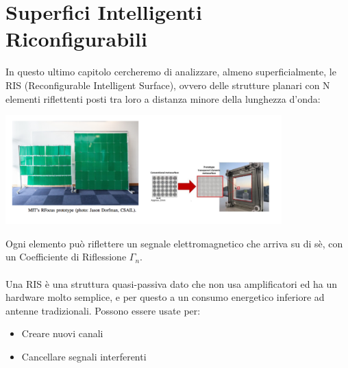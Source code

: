 \chapter{Superfici Intelligenti Riconfigurabili}
In questo ultimo capitolo cercheremo di analizzare, almeno superficialmente, le RIS (Reconfigurable Intelligent Surface), ovvero delle strutture planari con N elementi riflettenti posti tra loro a distanza minore della lunghezza d'onda:
\begin{center}
    \includegraphics[width=0.8\textwidth]{Images/RIS.png}
\end{center}
Ogni elemento può riflettere un segnale elettromagnetico che arriva su di sè, con un Coefficiente di Riflessione $\Gamma_n$.\\ \\
Una RIS è una struttura quasi-passiva dato che non usa amplificatori ed ha un hardware molto semplice, e per questo a un consumo energetico inferiore ad antenne tradizionali.
Possono essere usate per:
\begin{itemize}
    \item Creare nuovi canali
    \item Cancellare segnali interferenti
\end{itemize}

